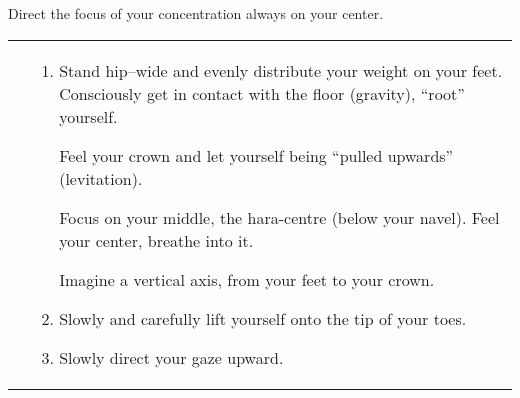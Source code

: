\documentclass[../main.tex]{subfiles}
\begin{document}
\label{Ex:Equi}
Direct the focus of your concentration always on your center.

\noindent
\begin{tabular}{l p{9cm} }
 \raisebox{-\totalheight}{\texttt{[image: EqEx1]}} & 
\begin{enumerate}[label=\alph*)]
\item Stand hip--wide and evenly distribute your weight on your feet. Consciously get in {contact with the floor} (gravity), ``root'' yourself.

Feel your {crown} and let yourself being ``pulled upwards'' (levitation).

Focus on your middle, the hara-centre (below your navel). Feel your {center}, breathe into it.

Imagine a {vertical axis}, from your feet to your crown.

\item Slowly and carefully {lift yourself} onto the tip of your toes.
                                      
\item Slowly direct your {gaze upward}.
\end{enumerate}
\\
\end{tabular}
\end{document}
